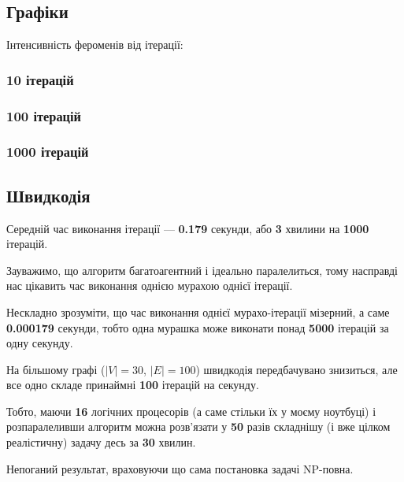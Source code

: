 \documentclass[a4paper, 12pt]{article}
\numberwithin{equation}{section}
\begin{document}
\subsection{Графіки}

Інтенсивність фероменів від ітерації:

\subsubsection{10 ітерацій}

\begin{figure}[H]
    \centering
\end{figure}

\subsubsection{100 ітерацій}

\begin{figure}[H]
    \centering
\end{figure}

\subsubsection{1000 ітерацій}

\begin{figure}[H]
    \centering
\end{figure}

\subsection{Швидкодія}

Середній час виконання ітерації --- \textbf{0.179} секунди, або \textbf{3} хвилини на \textbf{1000} ітерацій. \medskip

Зауважимо, що алгоритм багатоагентний і ідеально паралелиться, тому насправді нас цікавить час виконання однією мурахою однієї ітерації.  \medskip

Нескладно зрозуміти, що час виконання однієї мурахо-ітерації мізерний, а саме \textbf{0.000179} секунди, тобто одна мурашка може виконати понад \textbf{5000} ітерацій за одну секунду. \medskip

На більшому графі ($\vert V \vert = 30$, $\vert E \vert = 100$) швидкодія передбачувано знизиться, але все одно складе принаймні \textbf{100} ітерацій на секунду. \medskip

Тобто, маючи \textbf{16} логічних процесорів (а саме стільки їх у моєму ноутбуці) і розпаралеливши алгоритм можна розв'язати у \textbf{50} разів складнішу (і вже цілком реалістичну) задачу десь за \textbf{30} хвилин. \medskip

Непоганий результат, враховуючи що сама постановка задачі NP-повна.

% 
% 
\end{document}
